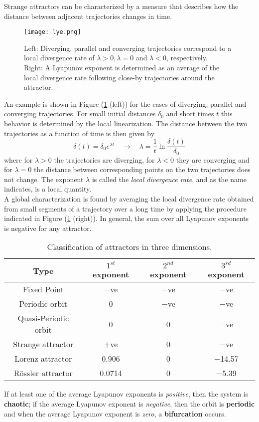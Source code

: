 Strange attractors can be characterized by a measure that describes how the distance between adjacent trajectories changes in time.
\begin{figure}
	\centering
	\texttt{[image: lye.png]}
	\caption{Left: Diverging, parallel and converging trajectories correspond to a local divergence rate of $\lambda>0, \lambda=0$ and $\lambda<0$, respectively.\\ Right: A Lyapunov exponent is determined as an average of the local divergence rate following close-by trajectories around the attractor.}
	\label{fig:lye}
\end{figure}
An example is shown in Figure (\ref{fig:lye} (left))  for the cases of diverging, parallel and converging trajectories.
For small initial distances $\delta_0$ and short times $t$ this behavior is determined by the local linearization. The distance between the two trajectories as a function of time is then given by
\begin{equation}
	\delta(t)=\delta_0e^{\lambda t}\quad\rightarrow\quad
	\lambda=\frac{1}{t}\ln\frac{\delta(t)}{\delta_0}
\end{equation}
where for $\lambda>0$ the trajectories are diverging, for $\lambda<0$ they are converging and for $\lambda=0$ the distance between corresponding points on the two trajectories does not change.
The exponent $\lambda$ is called the \emph{local divergence rate}, and as the name indicates, is a local quantity.\\
A global characterization is found by averaging the local divergence rate obtained from small segments of a trajectory over a long time by applying the procedure indicated in Figure (\ref{fig:lye} (right)).
In general, the sum over all Lyapunov exponents is negative for any attractor.
{\renewcommand{\arraystretch}{1.2}
\begin{table}[h!]
	\centering
	\caption{Classification of attractors in three dimensions.}
	\label{tab:catd}
	\begin{tabular}{c c c c}
		Type&$1^{st}$ exponent&$2^{nd}$ exponent&$3^{rd}$ exponent\\
		\hline
		Fixed Point&$-$ve&$-$ve&$-$ve\\
		Periodic orbit&0&$-$ve&$-$ve\\
		Quasi-Periodic orbit&0&0&$-$ve\\
		Strange attractor&$+$ve&0&$-$ve\\
		Lorenz attractor&0.906&0&$-$14.57\\
		R\"ossler attractor&0.0714&0&$-$5.39\\
	\end{tabular}
\end{table}}
\begin{theorem}
	If at least one of the average Lyapunov exponents is \emph{positive}, then the system is \textbf{chaotic}; if the average Lyapunov exponent is \emph{negative}, then the orbit is \textbf{periodic} and when the average Lyapunov exponent is \emph{zero}, a \textbf{bifurcation} occurs.
\end{theorem}